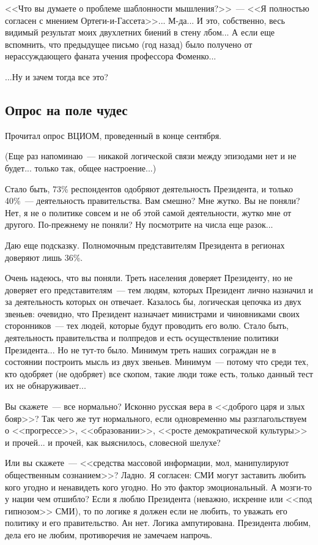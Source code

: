 \documentclass{scrbook}
\newcommand{\flqq}{<<}
\newcommand{\frqq}{>>}
\newcommand{\mdash}{~--- }
\newcommand{\essaysection}[1]{\subsection*{#1}\nopagebreak}
\begin{document}
{\flqq}Что вы думаете о проблеме шаблонности мышления?{\frqq}{\mdash}{\flqq}Я полностью согласен с мнением Ортеги-и-Гассета{\frqq}... М-да... И это, собственно, весь видимый результат моих двухлетних биений в стену лбом... А если еще вспомнить, что предыдущее письмо (год назад) было получено от нерассуждающего фаната учения профессора Фоменко...

...Ну и зачем тогда все это?

\essaysection{Опрос на поле чудес}

Прочитал опрос ВЦИОМ, проведенный в конце сентября.

(Еще раз напоминаю{\mdash}никакой логической связи между эпизодами нет и не будет... только так, общее настроение...)

Стало быть, 73\% респондентов одобряют деятельность Президента, и только 40\%{\mdash}деятельность правительства. Вам смешно? Мне жутко. Вы не поняли? Нет, я не о политике совсем и не об этой самой деятельности, жутко мне от другого. По-прежнему не поняли? Ну посмотрите на числа еще разок...

Даю еще подсказку. Полномочным представителям Президента в регионах доверяют лишь 36\%.

Очень надеюсь, что вы поняли. Треть населения доверяет Президенту, но не доверяет его представителям{\mdash}тем людям, которых Президент лично назначил и за деятельность которых он отвечает. Казалось бы, логическая цепочка из двух звеньев: очевидно, что Президент назначает министрами и чиновниками своих сторонников{\mdash}тех людей, которые будут проводить его волю. Стало быть, деятельность правительства и полпредов и есть осуществление политики Президента... Но не тут-то было. Минимум треть наших сограждан не в состоянии построить мысль из двух звеньев. Минимум{\mdash}потому что среди тех, кто одобряет (не одобряет) все скопом, такие люди тоже есть, только данный тест их не обнаруживает...

Вы скажете{\mdash}все нормально? Исконно русская вера в {\flqq}доброго царя и злых бояр{\frqq}? Так чего же тут нормального, если одновременно мы разглагольствуем о {\flqq}прогрессе{\frqq}, {\flqq}образовании{\frqq}, {\flqq}росте демократической культуры{\frqq} и прочей... и прочей, как выяснилось, словесной шелухе?

Или вы скажете{\mdash}{\flqq}средства массовой информации, мол, манипулируют общественным сознанием{\frqq}? Ладно. Я согласен: СМИ могут заставить любить кого угодно и ненавидеть кого угодно. Но это фактор эмоциональный. А мозги-то у нации чем отшибло? Если я люблю Президента (неважно, искренне или {\flqq}под гипнозом{\frqq} СМИ), то по логике я должен если не любить, то уважать его политику и его правительство. Ан нет. Логика ампутирована. Президента любим, дела его не любим, противоречия не замечаем напрочь.
\end{document}
